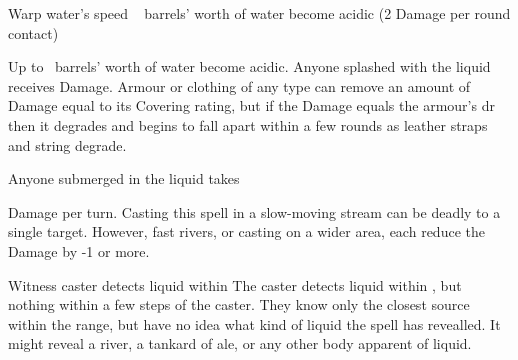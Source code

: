   {\mWater}%
  {Warp}%
  {\duplicated}%
  {water's speed}%
  {\spellArea\  barrels' worth of water become acidic (2 Damage per round contact)}%
  {
    Up to \spellArea\ barrels' worth of water become acidic.
    Anyone splashed with the liquid receives  Damage. 
    Armour or clothing of any type can remove an amount of Damage equal to its Covering rating, but if the Damage equals the armour's \gls{dr} then it degrades and begins to fall apart within a few rounds as leather straps and string degrade.

    Anyone submerged in the liquid takes \addtocounter{spelllevel}{2}  Damage per turn.
    Casting this spell in a slow-moving stream can be deadly to a single target.
    However, fast rivers, or casting on a wider area, each reduce the Damage by -1 or more.
  }

  {\mWater}%
  {Witness}%
  {\distant}%
  {}%
  {caster detects liquid within \spellRange}%
  {
    The caster detects liquid within \spellRange, but nothing within a few steps of the caster.
    They know only the closest source within the range, but have no idea what kind of liquid the spell has revealled.
    It might reveal a river, a tankard of ale, or any other body apparent of liquid.
  }
